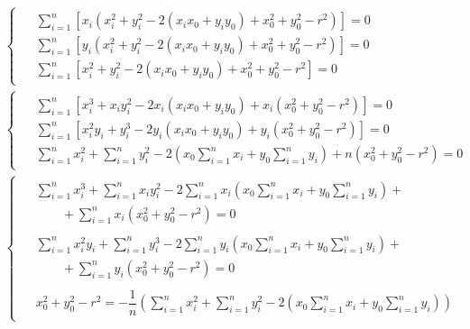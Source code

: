 \begin{align}
    \nonumber
    &\begin{cases}
         \begin{aligned}
             &\sum_{i=1}^{n} \left[ x_i \left(
             x_i^2 + y_i^2 - 2 (x_i x_0 + y_i y_0) + x_0^2 + y_0^2 - r^2 \right) \right] = 0 \\
             &\sum_{i=1}^{n} \left[ y_i \left(
             x_i^2 + y_i^2 - 2 (x_i x_0 + y_i y_0) + x_0^2 + y_0^2 - r^2 \right) \right] = 0 \\
             &\sum_{i=1}^{n} \left[
             x_i^2 + y_i^2 - 2 (x_i x_0 + y_i y_0) + x_0^2 + y_0^2 - r^2 \right] = 0
         \end{aligned}
    \end{cases} \\ \nonumber
    &\begin{cases}
         \begin{aligned}
             &\sum_{i=1}^{n} \left[
             x_i^3 + x_i y_i^2 - 2 x_i (x_i x_0 + y_i y_0)
             + x_i \left( x_0^2 + y_0^2 - r^2 \right) \right] = 0 \\
             &\sum_{i=1}^{n} \left[
             x_i^2 y_i + y_i^3 - 2 y_i (x_i x_0 + y_i y_0)
             + y_i \left( x_0^2 + y_0^2 - r^2 \right) \right] = 0 \\
             &\sum_{i=1}^{n} x_i^2 + \sum_{i=1}^{n} y_i^2
             - 2 \left( x_0 \sum_{i=1}^{n} x_i + y_0 \sum_{i=1}^{n} y_i \right)
             + n \left( x_0^2 + y_0^2 - r^2 \right) = 0
         \end{aligned}
    \end{cases} \\
    &\begin{cases}
         \label{eq:Circle_MNK_full_system}
         \begin{aligned}
             &\sum_{i=1}^{n} x_i^3 + \sum_{i=1}^{n} x_i y_i^2
             - 2 \sum_{i=1}^{n} x_i \left( x_0 \sum_{i=1}^{n} x_i + y_0 \sum_{i=1}^{n} y_i \right) + \\
             &\qquad + \sum_{i=1}^{n} x_i \left( x_0^2 + y_0^2 - r^2 \right) = 0 \\
             \\
             &\sum_{i=1}^{n} x_i^2 y_i + \sum_{i=1}^{n} y_i^3
             - 2 \sum_{i=1}^{n} y_i \left( x_0 \sum_{i=1}^{n} x_i + y_0 \sum_{i=1}^{n} y_i \right) + \\
             &\qquad + \sum_{i=1}^{n} y_i \left( x_0^2 + y_0^2 - r^2 \right) = 0 \\
             \\
             &x_0^2 + y_0^2 - r^2 = - \dfrac{1}{n} \left(
             \sum_{i=1}^{n} x_i^2 + \sum_{i=1}^{n} y_i^2
             - 2 \left( x_0 \sum_{i=1}^{n} x_i
             + y_0 \sum_{i=1}^{n} y_i \right)\right)
         \end{aligned}
    \end{cases}
\end{align} \\


